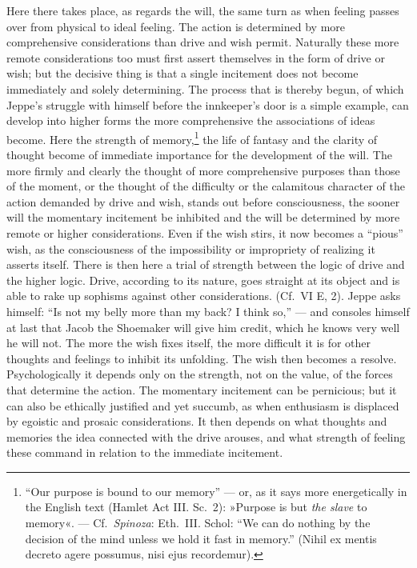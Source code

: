 \documentclass[12pt,a4paper]{book}
\newcommand{\opage}[1]{\marginnote{\footnotesize\textit{[#1]}}}
\begin{document}
Here there takes place, as regards the will, the same turn as when
feeling passes over from physical to ideal feeling. The action is
determined by more comprehensive considerations than drive and wish
permit. Naturally these more remote considerations too must first assert
themselves in the form of drive or wish; but the decisive thing is that a
single incitement does not become immediately and solely determining. The
process that is thereby begun, of which Jeppe's struggle with himself
before the innkeeper's door is a simple example, can develop into higher
forms the more comprehensive the associations of ideas become. Here the
strength of memory,\footnote{``Our purpose is bound to our memory'' ---
or, as it says more energetically in the English text (Hamlet Act III.
Sc.~2): »Purpose is but \emph{the slave} to memory«. --- Cf.\
\emph{Spinoza}: Eth.\ III. Schol: ``We can do nothing by the decision of
the mind unless we hold it fast in memory.'' (Nihil ex mentis decreto
agere possumus, nisi ejus recordemur).} the life of fantasy and
\opage{383}the clarity of thought become of immediate importance for the
development of the will. The more firmly and clearly the thought of more
comprehensive purposes than those of the moment, or the thought of the
difficulty or the calamitous character of the action demanded by drive
and wish, stands out before consciousness, the sooner will the momentary
incitement be inhibited and the will be determined by more remote or
higher considerations. Even if the wish stirs, it now becomes a ``pious''
wish, as the consciousness of the impossibility or impropriety of
realizing it asserts itself. There is then here a trial of strength
between the logic of drive and the higher logic. Drive, according to its
nature, goes straight at its object and is able to rake up sophisms
against other considerations. (Cf.\ VI E, 2). Jeppe asks himself: ``Is
not my belly more than my back? I think so,'' --- and consoles himself at
last that Jacob the Shoemaker will give him credit, which he knows very
well he will not. The more the wish fixes itself, the more difficult it
is for other thoughts and feelings to inhibit its unfolding. The wish
then becomes a resolve. Psychologically it depends only on the strength,
not on the value, of the forces that determine the action. The momentary
incitement can be pernicious; but it can also be ethically justified and
yet succumb, as when enthusiasm is displaced by egoistic and prosaic
considerations. It then depends on what thoughts and memories the idea
connected with the drive arouses, and what strength of feeling these
command in relation to the immediate incitement.
\end{document}
